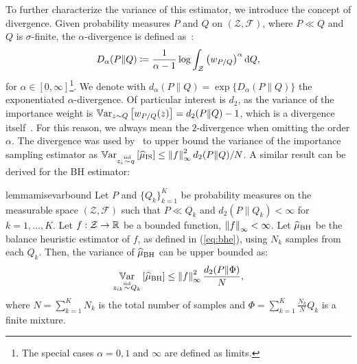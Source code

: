 \documentclass{article}
\begin{document}
To further characterize the variance of this estimator, we introduce the concept of \Renyi divergence. Given probability measures $P$ and $Q$ on $(\mathcal{Z},\mathcal{F})$, where $P\ll Q$ and $Q$ is $\sigma$-finite, the $\alpha$-\Renyi divergence is defined as~\cite{renyi1961measures}:
\begin{align}\label{eq:renyi}
	D_{\alpha}(P\|Q) \coloneqq \frac{1}{\alpha-1}\log\int_{\mathcal{Z}}\left(w_{P/Q}\right)^{\alpha}\de Q,
\end{align}
for $\alpha\in[0,\infty]$\footnote{The special cases $\alpha=0,1$ and $\infty$ are defined as limits.}.
We denote with $d_{\alpha}(P\|Q) = \exp\{D_{\alpha}(P\|Q)\}$ the exponentiated $\alpha$-\Renyi divergence. Of particular interest is $d_2$, as the variance of the importance weight is $\Var_{z\sim Q}\left[w_{P/Q}(z)\right] = d_2(P\|Q) - 1$, which is a divergence itself~\citep{cortes2010learning}. For this reason, we always mean the $2$-\Renyi divergence when omitting the order $\alpha$. The \Renyi divergence was used by~\citet[][Lemma 4.1]{metelli2018policy} to upper bound the variance of the importance sampling estimator as $\Var_{z_i\simiid q}\left[\wh{\mu}_{\text{IS}}\right]\leq \norm[\infty]{f}^2d_2(P\|Q)/N$. A similar result can be derived for the BH estimator:
%
\begin{restatable}{lemma}{misevarbound}\label{lem:misevarbound}
	Let $P$ and $\{ Q_k \}_{k=1}^K$ be probability measures on the measurable space $(\mathcal{Z},\mathcal{F})$ such that $P\ll Q_k$ and $d_2(P\|Q_k)<\infty$ for $k=1,\dots,K$. Let $f:\mathcal{Z}\to\Reals$ be a bounded function, \ie $\norm[\infty]{f}<\infty$. Let $\wh{\mu}_{\text{BH}}$ be the balance heuristic estimator of $f$, as defined in (\ref{eq:bhe}), using $N_k$ \iid samples from each $Q_k$. Then, the variance of $\wh{\mu}_{\text{BH}}$ can be upper bounded as:
	\begin{align*}
		\Var_{z_{ik}\simiid Q_k}\left[\wh{\mu}_{\text{BH}}\right] \leq \norm[\infty]{f}^2\frac{d_2(P\|\Phi)}{N},
	\end{align*}
	where ${N=\sum_{k=1}^{K}N_k}$ is the total number of samples and ${\Phi=\sum_{k=1}^K\frac{N_k}{N}Q_k}$ is a finite mixture.
\end{restatable}
%
\end{document}

